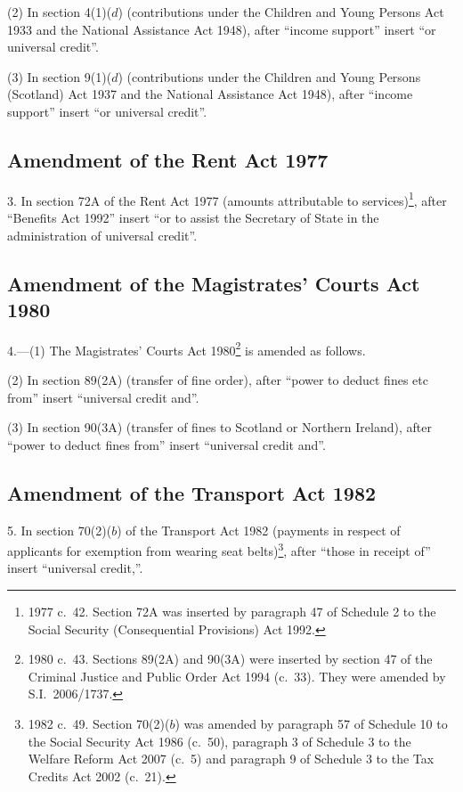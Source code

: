 \documentclass[12pt,a4paper]{article}
\begin{document}
(2) In section 4(1)($d$)  (contributions under the Children and Young Persons Act 1933 and the National Assistance Act 1948), after “income support” insert “or universal credit”.

(3) In section 9(1)($d$)  (contributions under the Children and Young Persons (Scotland) Act 1937 and the National Assistance Act 1948), after “income support” insert “or universal credit”.

\subsection[3. Amendment of the Rent Act 1977]{Amendment of the Rent Act 1977}

3.  In section 72A of the Rent Act 1977 (amounts attributable to services)\footnote{1977 c.~42. Section 72A was inserted by paragraph 47 of Schedule 2 to the Social Security (Consequential Provisions) Act 1992.}, after “Benefits Act 1992” insert “or to assist the Secretary of State in the administration of universal credit”.

\subsection[4. Amendment of the Magistrates’ Courts Act 1980]{Amendment of the Magistrates’ Courts Act 1980}

4.—(1) The Magistrates’ Courts Act 1980\footnote{1980 c.~43. Sections 89(2A) and 90(3A) were inserted by section 47 of the Criminal Justice and Public Order Act 1994 (c.~33). They were amended by S.I.~2006/1737.} is amended as follows.

(2) In section 89(2A) (transfer of fine order), after “power to deduct fines etc from” insert “universal credit and”.

(3) In section 90(3A) (transfer of fines to Scotland or Northern Ireland), after “power to deduct fines from” insert “universal credit and”.

\subsection[5. Amendment of the Transport Act 1982]{Amendment of the Transport Act 1982}

5.  In section 70(2)($b$)  of the Transport Act 1982 (payments in respect of applicants for exemption from wearing seat belts)\footnote{1982 c.~49. Section 70(2)($b$)  was amended by paragraph 57 of Schedule 10 to the Social Security Act 1986 (c.~50), paragraph 3 of Schedule 3 to the Welfare Reform Act 2007 (c.~5) and paragraph 9 of Schedule 3 to the Tax Credits Act 2002 (c.~21).}, after “those in receipt of” insert “universal credit,”.
\end{document}
